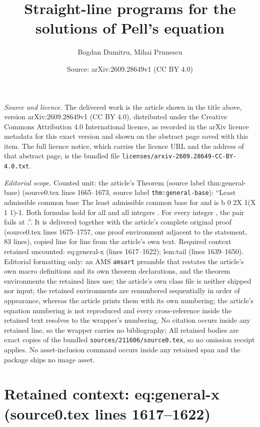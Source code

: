 \documentclass[10pt,a4paper]{amsart}
\title[Straight-line programs for the solutions of Pell's equation]{Straight-line programs for the solutions of Pell's equation}
\author{Bogdan Dumitru, Mihai Prunescu}
\date{Source: arXiv:2609.28649v1 (CC BY 4.0)}
\theoremstyle{plain}
\theoremstyle{remark}
\begin{document}
\maketitle

\noindent\emph{Source and licence.} The delivered work is the article shown in the title above, version arXiv:2609.28649v1 (CC BY 4.0), distributed under the Creative Commons Attribution 4.0 International licence, as recorded in the arXiv licence metadata for this exact version and shown on the abstract page saved with this item. The full licence notice, which carries the licence URL and the address of that abstract page, is the bundled file \texttt{licenses/arxiv-2609.28649-CC-BY-4.0.txt}.
\par\smallskip

\noindent\textit{Editorial scope.} Counted unit: the article's Theorem (source label thm:general-base) (source0.tex lines 1665--1673, source label \texttt{thm:general-base}): ``Least admissible common base The least admissible common base for and is b 0 2X 1(X 1 1)-1. Both formulas hold for all and all integers . For every integer , the pair fails at .''. It is delivered together with the article's complete original proof (source0.tex lines 1675--1757, one proof environment adjacent to the statement, 83 lines), copied line for line from the article's own text. Required context retained uncounted: eq:general-x (lines 1617--1622); lem:tail (lines 1639--1650). Editorial formatting only: an AMS \texttt{amsart} preamble that restates the article's own macro definitions and its own theorem declarations, and the theorem environments the retained lines use; the article's own class file is neither shipped nor input; the retained environments are renumbered sequentially in order of appearance, whereas the article prints them with its own numbering; the article's equation numbering is not reproduced and every cross-reference inside the retained text resolves to the wrapper's numbering. No citation occurs inside any retained line, so the wrapper carries no bibliography; All retained bodies are exact copies of the bundled \texttt{sources/211606/source0.tex}, so no omission receipt applies. No asset-inclusion command occurs inside any retained span and the package ships no image asset.


\section*{Retained context: eq:general-x (source0.tex lines 1617--1622)}
\end{document}
